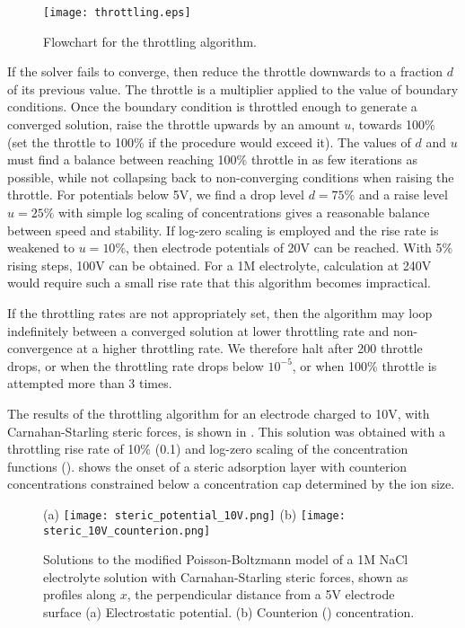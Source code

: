 \begin{figure}
\centering
\texttt{[image: throttling.eps]}
\caption{\label{fig_throttling_algorithm}Flowchart for the throttling algorithm. }
\end{figure}

If the solver fails to converge, then reduce the throttle downwards to
a fraction $d$ of its previous value. The throttle is a multiplier
applied to the value of boundary conditions.  Once the boundary
condition is throttled enough to generate a converged solution, raise
the throttle upwards by an amount $u$, towards 100\% (set the throttle
to 100\% if the procedure would exceed it).  The values of $d$ and $u$
must find a balance between reaching 100\% throttle in as few
iterations as possible, while not collapsing back to non-converging
conditions when raising the throttle.  For potentials below 5V, we
find a drop level $d=75\%$ and a raise level $u=25\%$ with simple log
scaling of concentrations gives a reasonable balance between speed and
stability. If log-zero scaling is employed and the rise rate is
weakened to $u=10\%$, then electrode potentials of 20V can be
reached. With 5\% rising steps, 100V can be obtained. For a 1M
electrolyte, calculation at 240V would require such a small rise rate
that this algorithm becomes impractical.

If the throttling rates are not appropriately set, then the algorithm
may loop indefinitely between a converged solution at lower throttling
rate and non-convergence at a higher throttling rate. We therefore
halt after 200 throttle drops, or when the throttling rate drops below
$10^{-5}$, or when 100\% throttle is attempted more than 3 times.

The results of the throttling algorithm for an electrode charged to
10V, with Carnahan-Starling steric forces, is shown in
. This solution was obtained with a
throttling rise rate of 10\% (0.1) and log-zero scaling of the
concentration functions
().  shows the onset
of a steric adsorption layer \cite{DagmawiParsons2022} with counterion
concentrations constrained below a concentration cap determined by the
ion size.

\begin{figure}
\centering
(a)
\texttt{[image: steric\_potential\_10V.png]}
(b)
\texttt{[image: steric\_10V\_counterion.png]}
\caption{\label{fig_results_throttling}Solutions to the modified
  Poisson-Boltzmann model of a 1M NaCl electrolyte solution with
  Carnahan-Starling steric forces, shown as profiles along $x$, the
  perpendicular distance from a 5V electrode surface (a) Electrostatic
  potential. (b) Counterion () concentration. }
\end{figure}

